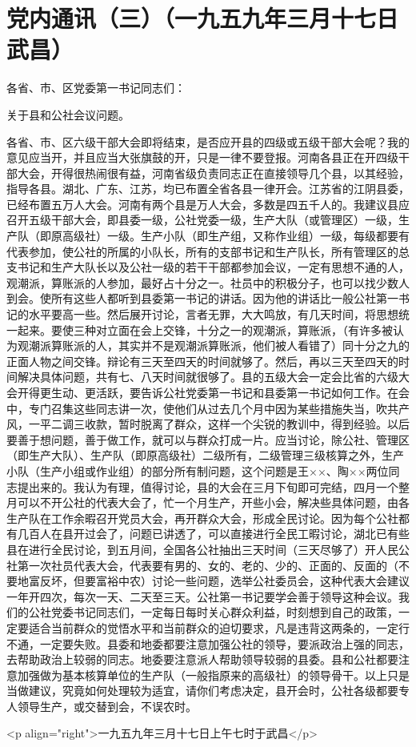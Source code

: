 \section[党内通讯（三）（一九五九年三月十七日武昌）]{党内通讯（三）（一九五九年三月十七日武昌）}


各省、市、区党委第一书记同志们：

关于县和公社会议问题。

各省、市、区六级干部大会即将结束，是否应开县的四级或五级干部大会呢？我的意见应当开，并且应当大张旗鼓的开，只是一律不要登报。河南各县正在开四级干部大会，开得很热闹很有益，河南省级负责同志正在直接领导几个县，以其经验，指导各县。湖北、广东、江苏，均已布置全省各县一律开会。江苏省的江阴县委，已经布置五万人大会。河南有两个县是万人大会，多数是四五千人的。我建议县应召开五级干部大会，即县委一级，公社党委一级，生产大队（或管理区）一级，生产队（即原高级社）一级。生产小队（即生产组，又称作业组）一级，每级都要有代表参加，使公社的所属的小队长，所有的支部书记和生产队长，所有管理区的总支书记和生产大队长以及公社一级的若干干部都参加会议，一定有思想不通的人，观潮派，算账派的人参加，最好占十分之一。社员中的积极分子，也可以找少数人到会。使所有这些人都听到县委第一书记的讲话。因为他的讲话比一般公社第一书记的水平要高一些。然后展开讨论，言者无罪，大大鸣放，有几天时间，将思想统一起来。要使三种对立面在会上交锋，十分之一的观潮派，算账派，（有许多被认为观潮派算账派的人，其实并不是观潮派算账派，他们被人看错了）同十分之九的正面人物之间交锋。辩论有三天至四天的时间就够了。然后，再以三天至四天的时间解决具体问题，共有七、八天时间就很够了。县的五级大会一定会比省的六级大会开得更生动、更活跃，要告诉公社党委第一书记和县委第一书记如何工作。在会中，专门召集这些同志讲一次，使他们从过去几个月中因为某些措施失当，吹共产风，一平二调三收款，暂时脱离了群众，这样一个尖锐的教训中，得到经验。以后要善于想问题，善于做工作，就可以与群众打成一片。应当讨论，除公社、管理区（即生产大队）、生产队（即原高级社）二级所有，二级管理三级核算之外，生产小队（生产小组或作业组）的部分所有制问题，这个问题是王××、陶××两位同志提出来的。我认为有理，值得讨论，县的大会在三月下旬即可完结，四月一个整月可以不开公社的代表大会了，忙一个月生产，开些小会，解决些具体问题，由各生产队在工作余暇召开党员大会，再开群众大会，形成全民讨论。因为每个公社都有几百人在县开过会了，问题已讲透了，可以直接进行全民工暇讨论，湖北已有些县在进行全民讨论，到五月间，全国各公社抽出三天时间（三天尽够了）开人民公社第一次社员代表大会，代表要有男的、女的、老的、少的、正面的、反面的（不要地富反坏，但要富裕中农）讨论一些问题，选举公社委员会，这种代表大会建议一年开四次，每次一天、二天至三天。公社第一书记要学会善于领导这种会议。我们的公社党委书记同志们，一定每日每时关心群众利益，时刻想到自己的政策，一定要适合当前群众的觉悟水平和当前群众的迫切要求，凡是违背这两条的，一定行不通，一定要失败。县委和地委都要注意加强公社的领导，要派政治上强的同志，去帮助政治上较弱的同志。地委要注意派人帮助领导较弱的县委。县和公社都要注意加强做为基本核算单位的生产队（一般指原来的高级社）的领导骨干。以上只是当做建议，究竟如何处理较为适宜，请你们考虑决定，县开会时，公社各级都要专人领导生产，或交替到会，不误农时。

<p align="right">一九五九年三月十七日上午七时于武昌</p>



